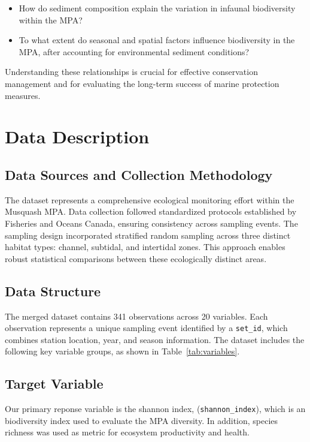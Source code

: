 \documentclass[12pt]{article}
\begin{document}
\begin{itemize}
    \item How do sediment composition explain the variation in infaunal
    biodiversity within the MPA?
    \item To what extent do seasonal and spatial factors influence biodiversity
    in the MPA, after accounting for environmental sediment conditions?
\end{itemize}

\qquad Understanding these relationships is crucial for effective conservation
management and for evaluating the long-term success of marine protection
measures.

\newpage

\section{Data Description}

\subsection{Data Sources and Collection Methodology}

\qquad The dataset represents a comprehensive ecological monitoring effort
within the Musquash MPA. Data collection followed standardized protocols
established by Fisheries and Oceans Canada, ensuring consistency across sampling
events. The sampling design incorporated stratified random sampling across three
distinct habitat types: channel, subtidal, and intertidal zones. This approach
enables robust statistical comparisons between these ecologically distinct
areas.

\subsection{Data Structure}

\qquad The merged dataset contains 341 observations across 20 variables. Each
observation represents a unique sampling event identified by a \texttt{set\_id},
which combines station location, year, and season information. The dataset
includes the following key variable groups, as shown in
Table~\ref{tab:variables}. 

\subsection{Target Variable}

\qquad Our primary reponse variable is the shannon index,
(\texttt{shannon\_index}), which is an biodiversity index used to evaluate the
MPA diversity. In addition, species richness was used as  metric for ecosystem
productivity and health. 
\end{document}
